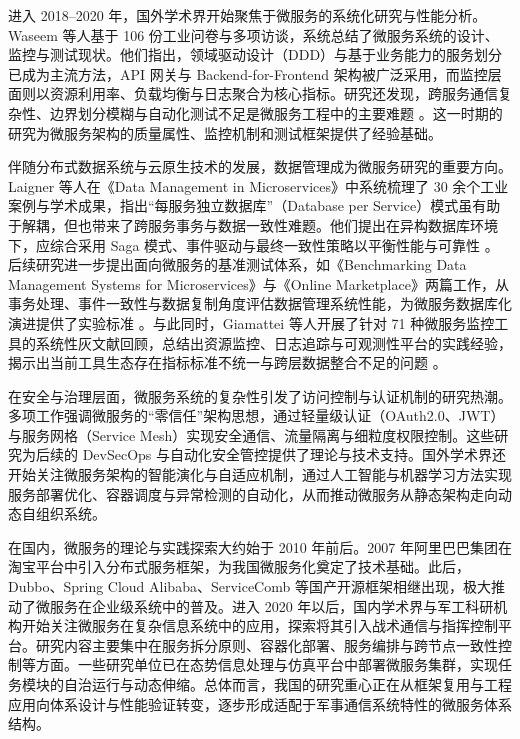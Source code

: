 进入 2018–2020 年，国外学术界开始聚焦于微服务的系统化研究与性能分析。Waseem 等人基于 106 份工业问卷与多项访谈，系统总结了微服务系统的设计、监控与测试现状。他们指出，领域驱动设计（DDD）与基于业务能力的服务划分已成为主流方法，API 网关与 Backend-for-Frontend 架构被广泛采用，而监控层面则以资源利用率、负载均衡与日志聚合为核心指标。研究还发现，跨服务通信复杂性、边界划分模糊与自动化测试不足是微服务工程中的主要难题 \cite{Waseem2021Design}。这一时期的研究为微服务架构的质量属性、监控机制和测试框架提供了经验基础。

伴随分布式数据系统与云原生技术的发展，数据管理成为微服务研究的重要方向。Laigner 等人在《Data Management in Microservices》中系统梳理了 30 余个工业案例与学术成果，指出“每服务独立数据库”（Database per Service）模式虽有助于解耦，但也带来了跨服务事务与数据一致性难题。他们提出在异构数据库环境下，应综合采用 Saga 模式、事件驱动与最终一致性策略以平衡性能与可靠性 \cite{Laigner2021Data}。后续研究进一步提出面向微服务的基准测试体系，如《Benchmarking Data Management Systems for Microservices》与《Online Marketplace》两篇工作，从事务处理、事件一致性与数据复制角度评估数据管理系统性能，为微服务数据库化演进提供了实验标准 \cite{BenchmarkingDataMgmt2024,OnlineMarketplace2024}。与此同时，Giamattei 等人开展了针对 71 种微服务监控工具的系统性灰文献回顾，总结出资源监控、日志追踪与可观测性平台的实践经验，揭示出当前工具生态存在指标标准不统一与跨层数据整合不足的问题 \cite{MonitoringTools2024}。

在安全与治理层面，微服务系统的复杂性引发了访问控制与认证机制的研究热潮。多项工作强调微服务的“零信任”架构思想，通过轻量级认证（OAuth2.0、JWT）与服务网格（Service Mesh）实现安全通信、流量隔离与细粒度权限控制。这些研究为后续的 DevSecOps 与自动化安全管控提供了理论与技术支持。国外学术界还开始关注微服务架构的智能演化与自适应机制，通过人工智能与机器学习方法实现服务部署优化、容器调度与异常检测的自动化，从而推动微服务从静态架构走向动态自组织系统。

在国内，微服务的理论与实践探索大约始于 2010 年前后。2007 年阿里巴巴集团在淘宝平台中引入分布式服务框架，为我国微服务化奠定了技术基础。此后，Dubbo、Spring Cloud Alibaba、ServiceComb 等国产开源框架相继出现，极大推动了微服务在企业级系统中的普及。进入 2020 年以后，国内学术界与军工科研机构开始关注微服务在复杂信息系统中的应用，探索将其引入战术通信与指挥控制平台。研究内容主要集中在服务拆分原则、容器化部署、服务编排与跨节点一致性控制等方面。一些研究单位已在态势信息处理与仿真平台中部署微服务集群，实现任务模块的自治运行与动态伸缩。总体而言，我国的研究重心正在从框架复用与工程应用向体系设计与性能验证转变，逐步形成适配于军事通信系统特性的微服务体系结构。


